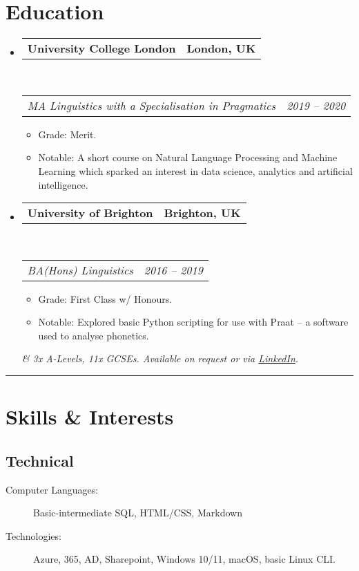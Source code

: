 \documentclass[10pt,a4paper]{article}
\makeatletter
\newenvironment{indentsection}[1]%
{\begin{list}{}%
	{\setlength{\leftmargin}{#1}}%
	\item[]%
}
{\end{list}}
\newcommand{\headerrow}[2]
{\begin{tabular*}{\linewidth}{l@{\extracolsep{\fill}}r}
	#1 &
	#2 \\
\end{tabular*}}
\makeatother
\begin{document}
\section*{Education}

\begin{itemize}
	\parskip=0.1em

	\item 
	\headerrow
		{\textbf{University College London}}
		{\textbf{London, UK}}
	\\
	\headerrow
		{\emph{MA Linguistics with a Specialisation in Pragmatics}}
		{\emph{2019 -- 2020}}
	\begin{itemize}
		\item Grade: Merit.
		\item Notable: A short course on Natural Language Processing and Machine Learning which sparked an interest in data science, analytics and artificial intelligence.
	\end{itemize}
    \item 
	\headerrow
		{\textbf{University of Brighton}}
		{\textbf{Brighton, UK}}
	\\
	\headerrow
		{\emph{BA(Hons) Linguistics}}
		{\emph{2016 -- 2019}}
	\begin{itemize}
		\item Grade: First Class w/ Honours.
		\item Notable: Explored basic Python scripting for use with Praat -- a software used to analyse phonetics.
	\end{itemize}
    \begin{center}
        \emph{\color{gray}\small \& 3x A-Levels, 11x GCSEs. Available on request or via \href{https://www.linkedin.com/in/artydh}{LinkedIn}.}
    \end{center}
\end{itemize}

\hrule
\vspace{1.75em}

\section*{Skills \& Interests}
\subsection*{Technical}
\begin{indentsection}{\parindent}
\begin{description}
	\item[Computer Languages:]
	Basic-intermediate SQL, HTML/CSS, Markdown
    \item[Technologies:]
    Azure, 365, AD, Sharepoint, Windows 10/11, macOS, basic Linux CLI.
\end{description}
\end{indentsection}
\end{document}
